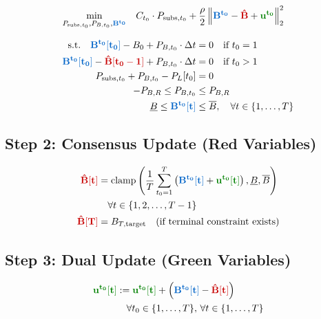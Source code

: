 \documentclass[11pt]{article}
\newcommand{\blueB}[1]{\textcolor{bluevar}{\mathbf{#1}}}      %
\newcommand{\redBhat}[1]{\textcolor{redvar}{\mathbf{#1}}}     %
\newcommand{\greenu}[1]{\textcolor{greenvar}{\mathbf{#1}}}    %
\begin{document}
\begin{align}
\min_{P_{\text{subs},t_0}, P_{B,t_0}, \blueB{B^{t_0}}} \quad & C_{t_0} \cdot P_{\text{subs},t_0} + \frac{\rho}{2} \left\| \blueB{B^{t_0}} - \redBhat{\hat{B}} + \greenu{u^{t_0}} \right\|_2^2
\end{align}

\begin{align}
\text{s.t.} \quad \blueB{B^{t_0}[t_0]} - B_0 + P_{B,t_0} \cdot \Delta t &= 0 \quad \text{if } t_0 = 1 \\
\blueB{B^{t_0}[t_0]} - \redBhat{\hat{B}[t_0-1]} + P_{B,t_0} \cdot \Delta t &= 0 \quad \text{if } t_0 > 1 \\
P_{\text{subs},t_0} + P_{B,t_0} - P_L[t_0] &= 0 \\
-P_{B,R} \leq P_{B,t_0} &\leq P_{B,R} \\
\underline{B} \leq \blueB{B^{t_0}[t]} &\leq \overline{B}, \quad \forall t \in \{1, \ldots, T\}
\end{align}


\subsection{Step 2: Consensus Update (Red Variables)}
\begin{align}
\redBhat{\hat{B}[t]} &= \text{clamp}\left( \frac{1}{T} \sum_{t_0=1}^{T} \left( \blueB{B^{t_0}[t]} + \greenu{u^{t_0}[t]} \right), \underline{B}, \overline{B} \right) \\
&\quad \forall t \in \{1, 2, \ldots, T-1\} \\
\redBhat{\hat{B}[T]} &= B_{T,\text{target}} \quad \text{(if terminal constraint exists)}
\end{align}

\subsection{Step 3: Dual Update (Green Variables)}
\begin{align}
\greenu{u^{t_0}[t]} &:= \greenu{u^{t_0}[t]} + \left( \blueB{B^{t_0}[t]} - \redBhat{\hat{B}[t]} \right) \\
&\quad \forall t_0 \in \{1, \ldots, T\}, \, \forall t \in \{1, \ldots, T\}
\end{align}
\end{document}
